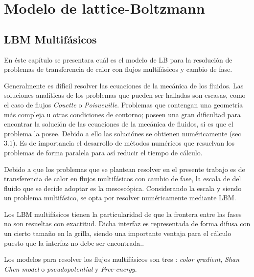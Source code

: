 \chapter{Modelo de lattice-Boltzmann}
\graphicspath{{figs/cap3/}}
\label{cap3}

\section{LBM Multifásicos}

En éste capítulo se presentara cuál es el modelo de LB para la resolución de problemas de transferencia de calor con flujos multifásicos y cambio de fase.

Generalmente es difícil resolver las ecuaciones de la mecánica de los fluidos. Las soluciones analíticas de los problemas que pueden ser halladas son escasas, como el caso de flujos \textit{Couette} o \textit{Poisueuille}. Problemas que contengan una geometría más compleja u otras condiciones de contorno; poseen una gran dificultad para encontrar la solución de las ecuaciones de la mecánica de fluidos, si es que el problema la posee. Debido a ello las soluciónes se obtienen numéricamente \cite{kruger2017lattice}(sec 3.1). Es de importancia el desarrollo de métodos numéricos que resuelvan los problemas de forma paralela para así reducir el tiempo de cálculo.

Debido a que los problemas que se plantean resolver en el presente trabajo es de transferencia de calor en flujos multifásicos con cambio de fase, la escala de del fluido que se decide adoptar es la mesoscópica. Considerando la escala y siendo un problema multifásico, se opta por resolver numéricamente mediante LBM. 

Los LBM multifásicos tienen la particularidad de que la frontera entre las fases no son resueltas con exactitud. Dicha interfaz es representada de forma difusa con un cierto tamaño en la grilla, siendo una importante ventaja para el cálculo puesto que la interfaz no debe ser encontrada.\cite{parrill2019reviews}.

Los modelos para resolver los flujos multifásicos son tres : \textit{color gradient}, \textit{Shan Chen model} o \textit{pseudopotential} y \textit{Free-energy}. 

